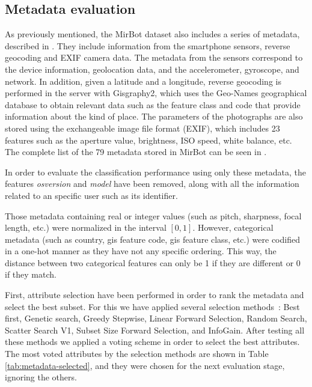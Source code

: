 \documentclass[final, twocolumn]{elsarticle}
\begin{document}
\subsection{Metadata evaluation}
\label{sec:metadata}

As previously mentioned, the MirBot dataset also includes a series of metadata, described in \cite{MirBot:System}. They include information from the smartphone sensors, reverse geocoding and EXIF camera data.
The metadata from the sensors correspond to the device information, geolocation data, and the accelerometer, gyroscope, and network. In addition, given a latitude and a longitude, reverse geocoding is performed in the server with Gisgraphy2, which uses the Geo-Names geographical database to obtain relevant data such as the feature class and code that provide information about the kind of place. The parameters of the photographs are also stored using the  exchangeable image file format (EXIF), which includes 23 features such as the aperture value, brightness, ISO speed, white balance, etc. The complete list of the 79 metadata stored in MirBot can be seen in \cite{MirBot:System}.

In order to evaluate the classification performance using only these metadata, the features \textit{osversion} and \textit{model} have been removed, along with all the information related to an specific user such as its identifier.

Those metadata containing real or integer values (such as pitch, sharpness, focal length, etc.) were normalized in the interval $[0,1]$. However, categorical metadata (such as country, gis feature code, gis feature class, etc.) were codified in a one-hot manner as they have not any specific ordering. This way, the distance between two categorical features can only be 1 if they are different or 0 if they match.


First, attribute selection have been performed in order to rank the metadata and select the best subset. For this we have applied several selection methods~\cite{weka}: %
Best first, Genetic search, Greedy Stepwise, Linear Forward Selection, Random Search, Scatter Search V1, Subset Size Forward Selection, and InfoGain. %
After testing all these methods we applied a voting scheme in order to select the best attributes. The most voted attributes by the selection methods are shown in Table \ref{tab:metadata-selected}, and they were chosen for the next evaluation stage, ignoring the others.
\end{document}

